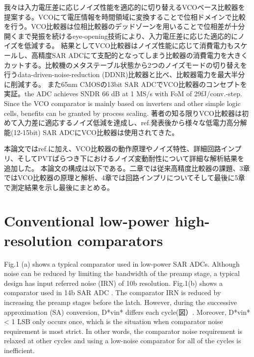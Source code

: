 \documentclass[letterpaper, 10 pt, conference]{ieeeconf}  %
\begin{document}
我々は入力電圧差に応じノイズ性能を適応的に切り替えるVCOベース比較器を提案する\cite{yoshioka201413b}。VCOにて電圧情報を時間領域に変換することで位相ドメインで比較を行う。VCO比較器は位相比較器のデッドゾーンを用いることで位相差が十分開くまで発振を続けるeye-opening技術により、入力電圧差に応じた適応的にノイズを低減する。
結果としてVCO比較器はノイズ性能に応じて消費電力もスケールし、高精度SAR ADCにて支配的となってしまう比較器の消費電力を大きくカットする。比較機のメタステーブル状態から2つのノイズモードの切り替えを行うdata-driven-noise-reduction (DDNR)比較器\cite{harpe201310b}と比べ、比較器電力を最大半分に削減する。
また65nm CMOSの13bit SAR ADCでVCO比較器のコンセプトを実証。the ADC achieves SNDR 66 dB at 1 MS/s with FoM of 29fJ/conv.-step. Since the VCO comparator is mainly based on inverters and other simple logic cells, benefits can be granted by process scaling.
著者の知る限りVCO比較器は初めて入力差に適応するノイズ低減を達成し、ref.\cite{yoshioka201413b}発表後から様々な低電力高分解能(12-15bit) SAR ADCにVCO比較器は使用されてきた\cite{ding20190, luo2020input, hsieh20180, li2019design, li202065, almarashli2017nyquist, shim2017edge, zhu201914, pan202012, lee2019fast}。

本論文ではref.\cite{yoshioka201413b}に加え、VCO比較器の動作原理やノイズ特性、詳細回路インプリ、そしてPVTばらつき下におけるノイズ変動耐性について詳細な解析結果を追加した。
本論文の構成は以下である。二章では従来高精度比較器の課題、3章ではVCO比較器の原理と解析、4章では回路インプリについてそして最後に5章で測定結果を示し最後にまとめる。


\section{Conventional low-power high-resolution comparators}

Fig.1 (a) shows a typical comparator \cite{miyahara2008low} used in low-power SAR ADCs. Although noise can be reduced by limiting the bandwidth of the preamp stage, a typical design has input referred noise (IRN) of 10b resolution. Fig.1(b) shows a comparator used in 14b SAR ADC \cite{hesener200714b}. The comparator IRN is reduced by increasing the preamp stages before the latch. However, during the successive approximation (SA) conversion, D*vin* differs each cycle(図）. Moreover, D*vin* < 1 LSB only occurs once, which is the situation when comparator noise requirement is most strict. In other words, the comparator noise requirement is relaxed at other cycles and using a low-noise comparator for all of the cycles is inefficient. 
\end{document}
